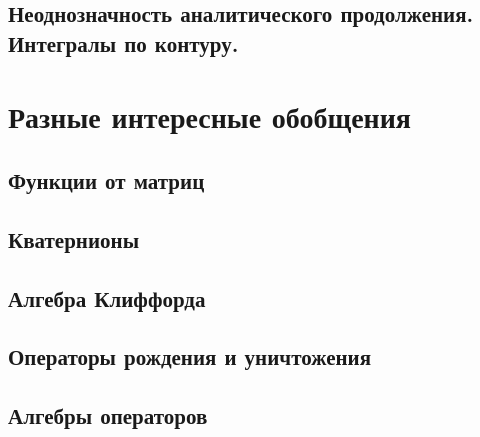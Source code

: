 \documentclass{article}
\begin{document}
\subsection{Неоднозначность аналитического продолжения. Интегралы по контуру.}

\section{Разные интересные обобщения}
\subsection{Функции от матриц}
\subsection{Кватернионы}
\subsection{Алгебра Клиффорда}
\subsection{Операторы рождения и уничтожения}
\subsection{Алгебры операторов}
\end{document}
